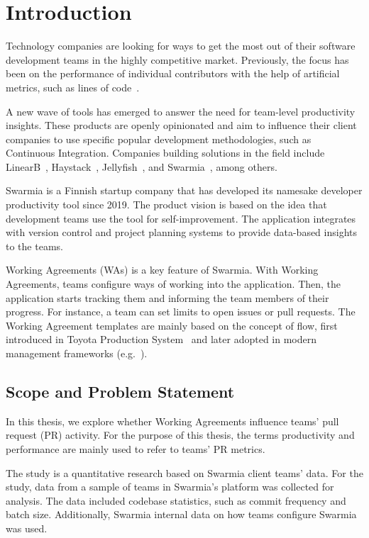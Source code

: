 \chapter{Introduction}

Technology companies are looking for ways to get the most out of their software development teams in the highly competitive market. Previously, the focus has been on the performance of individual contributors with the help of artificial metrics, such as lines of code~\cite{rosenberg_misconceptions_1997}.

A new wave of tools has emerged to answer the need for team-level productivity insights. These products are openly opinionated and aim to influence their client companies to use specific popular development methodologies, such as Continuous Integration. Companies building solutions in the field include LinearB~\cite{linearb_developer_2022}, Haystack~\cite{haystack_haystack_2022}, Jellyfish~\cite{jellyfish_align_2022}, and Swarmia~\cite{swarmia_gain_2022}, among others.

Swarmia is a Finnish startup company that has developed its namesake developer productivity tool since 2019. The product vision is based on the idea that development teams use the tool for self-improvement. The application integrates with version control and project planning systems to provide data-based insights to the teams. 

Working Agreements (WAs) is a key feature of Swarmia. With Working Agreements, teams configure ways of working into the application. Then, the application starts tracking them and informing the team members of their progress. For instance, a team can set limits to open issues or pull requests. The Working Agreement templates are mainly based on the concept of flow, first introduced in Toyota Production System~\cite{ono_toyota_1988} and later adopted in modern management frameworks (e.g.~\cite{krafcik_triumph_1988,cohen_introduction_2004}).

\section{Scope and Problem Statement}

In this thesis, we explore whether Working Agreements influence teams' pull request (PR) activity. For the purpose of this thesis, the terms productivity and performance are mainly used to refer to  teams' PR metrics.

The study is a quantitative research based on Swarmia client teams' data. For the study, data from a sample of teams in Swarmia's platform was collected for analysis. The data included codebase statistics, such as commit frequency and batch size. Additionally, Swarmia internal data on how teams configure Swarmia was used.


